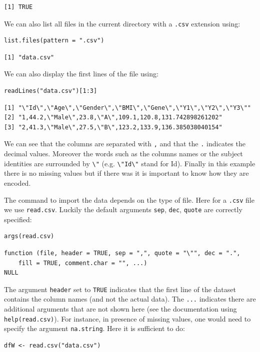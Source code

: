 \documentclass[12pt]{article}
\begin{document}
\begin{verbatim}
[1] TRUE
\end{verbatim}

We can also list all files in the current directory with a \texttt{.csv} extension using:
\lstset{language=r,label= ,caption= ,captionpos=b,numbers=none}
\begin{lstlisting}
list.files(pattern = ".csv")
\end{lstlisting}

\begin{verbatim}
[1] "data.csv"
\end{verbatim}

\clearpage

We can also display the first lines of the file using:
\lstset{language=r,label= ,caption= ,captionpos=b,numbers=none}
\begin{lstlisting}
readLines("data.csv")[1:3]
\end{lstlisting}

\begin{verbatim}
[1] "\"Id\",\"Age\",\"Gender\",\"BMI\",\"Gene\",\"Y1\",\"Y2\",\"Y3\""
[2] "1,44.2,\"Male\",23.8,\"A\",109.1,120.8,131.742898261202"        
[3] "2,41.3,\"Male\",27.5,\"B\",123.2,133.9,136.385038040154"
\end{verbatim}

We can see that the columns are separated with \texttt{,} and that the \texttt{.}
indicates the decimal values. Moreover the words such as the columns
names or the subject identities are surrounded by \texttt{\textbackslash{}"} (e.g. \texttt{\textbackslash{}"Id\textbackslash{}"}
stand for Id). Finally in this example there is no missing values but
if there was it is important to know how they are encoded.

\bigskip

 The command to import the data depends on the type of file. Here for
a \texttt{.csv} file we use \texttt{read.csv}. Luckily the default arguments \texttt{sep},
\texttt{dec}, \texttt{quote} are correctly specified:
\lstset{language=r,label= ,caption= ,captionpos=b,numbers=none}
\begin{lstlisting}
args(read.csv)
\end{lstlisting}

\begin{verbatim}
function (file, header = TRUE, sep = ",", quote = "\"", dec = ".", 
    fill = TRUE, comment.char = "", ...) 
NULL
\end{verbatim}

The argument \texttt{header} set to \texttt{TRUE} indicates that the first line of
the dataset contains the column names (and not the actual data). The
\texttt{...} indicates there are additional arguments that are not shown here
(see the documentation using \texttt{help(read.csv)}). For instance, in
presence of missing values, one would need to specify the argument
\texttt{na.string}. Here it is sufficient to do:
\lstset{language=r,label= ,caption= ,captionpos=b,numbers=none}
\begin{lstlisting}
dfW <- read.csv("data.csv")
\end{lstlisting}
\end{document}
